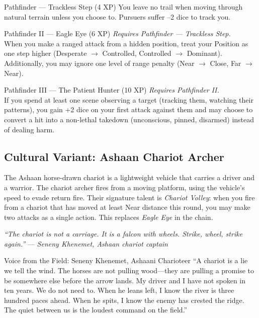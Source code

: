 \documentclass[9pt,a5paper]{extbook}
\begin{document}
\begin{talentbox}{Pathfinder --- Trackless Step (4 XP)}
You leave no trail when moving through natural terrain unless you choose to. Pursuers suffer --2 dice to track you.
\end{talentbox}

\begin{talentbox}{Pathfinder II --- Eagle Eye (6 XP)}
\textit{Requires Pathfinder --- Trackless Step.} \\
When you make a ranged attack from a hidden position, treat your Position as one step higher (Desperate $\rightarrow$ Controlled, Controlled $\rightarrow$ Dominant). Additionally, you may ignore one level of range penalty (Near $\rightarrow$ Close, Far $\rightarrow$ Near).
\end{talentbox}

\begin{talentbox}{Pathfinder III --- The Patient Hunter (10 XP)}
\textit{Requires Pathfinder II.} \\
If you spend at least one scene observing a target (tracking them, watching their patterns), you gain +2 dice on your first attack against them and may choose to convert a hit into a non-lethal takedown (unconscious, pinned, disarmed) instead of dealing harm.
\end{talentbox}

\subsection{Cultural Variant: Ashaan Chariot Archer}
\label{culture:ashaan}
The Ashaan horse-drawn chariot is a lightweight vehicle that carries a driver and a warrior. The chariot archer fires from a moving platform, using the vehicle's speed to evade return fire. Their signature talent is \textit{Chariot Volley}: when you fire from a chariot that has moved at least Near distance this round, you may make two attacks as a single action. This replaces \textit{Eagle Eye} in the chain.

\vspace{0.2cm}
\noindent\textit{``The chariot is not a carriage. It is a falcon with wheels. Strike, wheel, strike again.''}  
\hfill --- \textit{Seneny Khenemet, Ashaan chariot captain}

\begin{warriorbox}{Voice from the Field: Seneny Khenemet, Ashaani Charioteer}
``A chariot is a lie we tell the wind. The horses are not pulling wood---they are pulling a promise to be somewhere else before the arrow lands. My driver and I have not spoken in ten years. We do not need to. When he leans left, I know the river is three hundred paces ahead. When he spits, I know the enemy has crested the ridge. The quiet between us is the loudest command on the field.''
\end{warriorbox}
\end{document}

